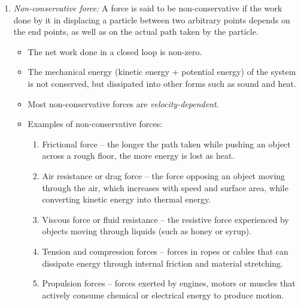 \begin{enumerate}
		\item \emph{Non-conservative force:} A force is said to be non-conservative if the work done by it in displacing a particle between two arbitrary points depends on the end points, as well as on the actual path taken by the particle.
		\begin{itemize}
			\item The net work done in a closed loop is non-zero.
			\item The mechanical energy (kinetic energy + potential energy) of the system is not conserved, but dissipated into other forms such as sound and heat.
			\item Most non-conservative forces are \emph{velocity-dependent}.
			\item Examples of non-conservative forces:
			\begin{enumerate}
				\item Frictional force -- the longer the path taken while pushing an object across a rough floor, the more energy is lost as heat.
				\item Air resistance or drag force -- the force opposing an object moving through the air, which increases with speed and surface area, while converting kinetic energy into thermal energy.
				\item Viscous force or fluid resistance -- the resistive force experienced by objects moving through liquids (such as honey or syrup).
				\item Tension and compression forces -- forces in ropes or cables that can dissipate energy through internal friction and material stretching.
				\item Propulsion forces -- forces exerted by engines, motors or muscles that actively consume chemical or electrical energy to produce motion.
			\end{enumerate}
		\end{itemize}
	\end{enumerate}
	
	\newpage
	\setcounter{equation}{0}
